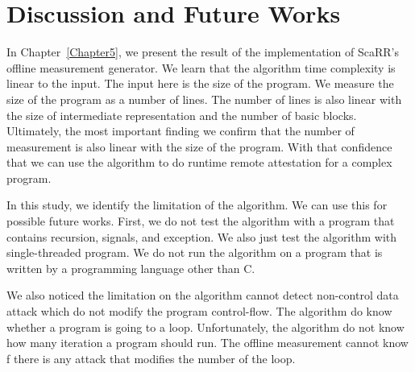 
\chapter{Discussion and Future Works} %

\label{Chapter6} %

In Chapter~\ref{Chapter5}, we present the result of the implementation of
ScaRR's offline measurement generator. We learn that the algorithm time
complexity is linear to the input. The input here is the size of the program. We
measure the size of the program as a number of lines. The number of lines is
also linear with the size of intermediate representation and the number of basic
blocks. Ultimately, the most important finding we confirm that the number of
measurement is also linear with the size of the program. With that confidence
that we can use the algorithm to do runtime remote attestation for a complex
program.

In this study, we identify the limitation of the algorithm. We can use this for
possible future works. First, we do not test the algorithm with a program that
contains recursion, signals, and exception. We also just test the algorithm with
single-threaded program. We do not run the algorithm on a program that is
written by a programming language other than C. 

We also noticed the limitation on the algorithm cannot detect non-control data
attack which do not modify the program control-flow. The algorithm do know
whether a program is going to a loop. Unfortunately, the algorithm do not know
how many iteration a program should run. The offline measurement cannot know f
there is any attack that modifies the number of the loop. 